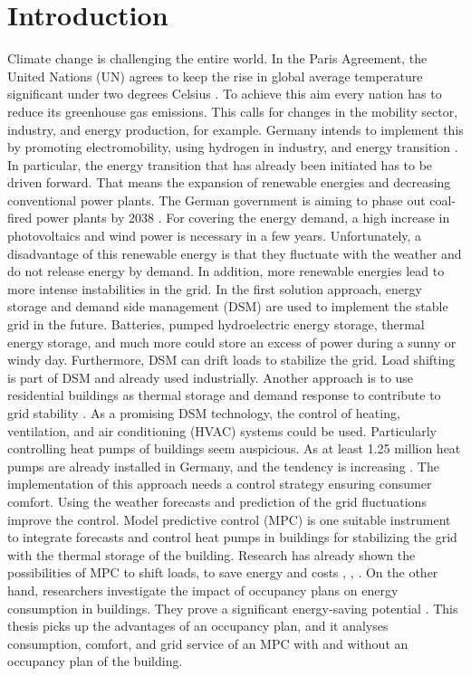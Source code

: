 \chapter{Introduction}
\label{ch:introduction}
Climate change is challenging the entire world. In the Paris Agreement, the United Nations (UN)  agrees to keep the rise in global average temperature significant under two degrees Celsius \cite{UnitedNations.2015}. To achieve this aim every nation has to reduce its greenhouse gas emissions. This calls for changes in the mobility sector, industry, and energy production, for example. Germany intends to implement this by promoting electromobility, using hydrogen in industry, and energy transition \cite{Deutschlandfunk.24.06.2021}. In particular, the energy transition that has already been initiated has to be driven forward. That means the expansion of renewable energies and decreasing conventional power plants. The German government is aiming to phase out coal-fired power plants by 2038 \cite{bundesregierung.2021}. For covering the energy demand, a high increase in photovoltaics and wind power is necessary in a few years. 
\newline
Unfortunately, a disadvantage of this renewable energy is that they fluctuate with the weather and do not release energy by demand. In addition, more renewable energies lead to more intense instabilities in the grid. In the first solution approach, energy storage and demand side management (DSM)  are used to implement the stable grid in the future. Batteries, pumped hydroelectric energy storage, thermal energy storage, and much more could store an excess of power during a sunny or windy day. Furthermore, DSM can drift loads to stabilize the grid. Load shifting is part of DSM \cite{Gellings.1985} and already used industrially. Another approach is to use residential buildings as thermal storage and demand response to contribute to grid stability \cite{Kohlhepp.2017}. As a promising DSM technology, the control of heating, ventilation, and air conditioning (HVAC) systems could be used. Particularly controlling heat pumps of buildings seem auspicious. As at least 1.25 million heat pumps are already installed in Germany, and the tendency is increasing \cite{BMW.2021}.
\newline
The implementation of this approach needs a control strategy ensuring consumer comfort. Using the weather forecasts and prediction of the grid fluctuations improve the control. Model predictive control (MPC)  is one suitable instrument to integrate forecasts and control heat pumps in buildings for stabilizing the grid with the thermal storage of the building. Research has already shown the possibilities of MPC to shift loads, to save energy and costs \cite{Oldewurtel.2010}, \cite{Hazyuk.2012b}, \cite{Zwickel.2019}.
On the other hand, researchers investigate the impact of occupancy plans on energy consumption in buildings. They prove a significant energy-saving potential \cite{Wang.2019}. This thesis picks up the advantages of an occupancy plan, and it analyses consumption, comfort, and grid service of an MPC with and without an occupancy plan of the building.
 

